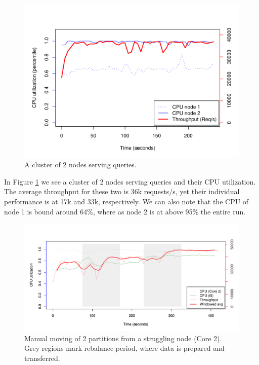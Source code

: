 \begin{figure}[h]
    \centering
    \includegraphics[width=1.0\textwidth]{results/baseline_slowpro_mini}
    \caption{A cluster of 2 nodes serving queries.}
    \label{fig:adaptive_base}
\end{figure}

In Figure \ref{fig:adaptive_base} we see a cluster of 2 nodes serving queries and their CPU utilization. The average throughput for these two is 36k requests/s, yet their individual performance is at 17k and 33k, respectively. We can also note that the CPU of node 1 is bound around 64\%, where as node 2 is at above 95\% the entire run.

\clearpage
\begin{figure}[h]
    \centering
    \includegraphics[width=1.2\textwidth]{results/rebalance_manual_2node}
    \caption{Manual moving of 2 partitions from a struggling node (Core 2). Grey regions mark rebalance period, where data is prepared and transferred.}
    \label{fig:adaptive_man}
\end{figure}


